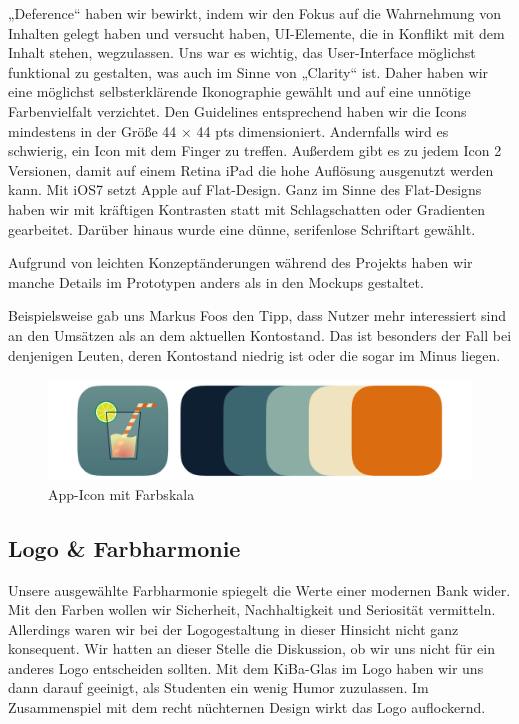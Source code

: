 	„Deference“ haben wir bewirkt, indem wir den Fokus auf die Wahrnehmung von Inhalten gelegt haben und versucht haben, UI-Elemente, die in Konflikt mit dem Inhalt stehen, wegzulassen. Uns war es wichtig, das User-Interface möglichst funktional zu gestalten, was auch im Sinne von „Clarity“ ist. Daher haben wir eine möglichst selbsterklärende Ikonographie gewählt und auf eine unnötige Farbenvielfalt verzichtet. Den Guidelines entsprechend haben wir die Icons mindestens in der Größe 44 $\times$ 44 pts dimensioniert. Andernfalls wird es schwierig, ein Icon mit dem Finger zu treffen. Außerdem gibt es zu jedem Icon 2 Versionen, damit auf einem Retina iPad die hohe Auflösung ausgenutzt werden kann. Mit iOS7 setzt Apple auf Flat-Design. Ganz im Sinne des Flat-Designs haben wir mit kräftigen Kontrasten statt mit Schlagschatten oder Gradienten gearbeitet. Darüber hinaus wurde eine dünne, serifenlose Schriftart gewählt.

	Aufgrund von leichten Konzeptänderungen während des Projekts haben wir manche Details im Prototypen anders als in den Mockups gestaltet.
	
	Beispielsweise gab uns Markus Foos den Tipp, dass Nutzer mehr interessiert sind an den Umsätzen als an dem aktuellen Kontostand. Das ist besonders der Fall bei denjenigen Leuten, deren Kontostand niedrig ist oder die sogar im Minus liegen. \par

\begin{figure}[h]
	\centering
	\includegraphics[scale=.52]{Pictures/Logo}
	\caption{App-Icon mit Farbskala}
\end{figure}
\subsection{Logo \& Farbharmonie}
	Unsere ausgewählte Farbharmonie spiegelt die Werte einer modernen Bank wider. Mit den Farben wollen wir Sicherheit, Nachhaltigkeit und Seriosität vermitteln. Allerdings waren wir bei der Logogestaltung in dieser Hinsicht nicht ganz konsequent. Wir hatten an dieser Stelle die Diskussion, ob wir uns nicht für ein anderes Logo entscheiden sollten. Mit dem KiBa-Glas im Logo haben wir uns dann darauf geeinigt, als Studenten ein wenig Humor zuzulassen. Im Zusammenspiel mit dem recht nüchternen Design wirkt das Logo auflockernd.

